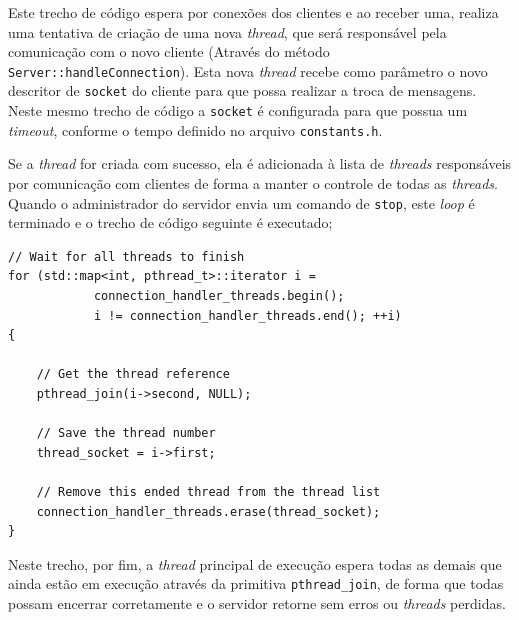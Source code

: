 \documentclass{article}
\begin{document}
\par Este trecho de código espera por conexões dos clientes e ao receber uma, realiza uma tentativa de criação de uma nova \textit{thread}, que será responsável pela comunicação com o novo cliente (Através do método \texttt{Server::handleConnection}). Esta nova \textit{thread} recebe como parâmetro o novo descritor de \texttt{socket} do cliente para que possa realizar a troca de mensagens. Neste mesmo trecho de código a \texttt{socket} é configurada para que possua um \textit{timeout}, conforme o tempo definido no arquivo \texttt{constants.h}.
\par Se a \textit{thread} for criada com sucesso, ela é adicionada à lista de \textit{threads} responsáveis por comunicação com clientes de forma a manter o controle de todas as \textit{threads}. Quando o administrador do servidor envia um comando de \texttt{stop}, este \textit{loop} é terminado e o trecho de código seguinte é executado;
\\
\begin{lstlisting}
// Wait for all threads to finish
for (std::map<int, pthread_t>::iterator i = 
            connection_handler_threads.begin();
            i != connection_handler_threads.end(); ++i)
{

    // Get the thread reference
    pthread_join(i->second, NULL);

    // Save the thread number
    thread_socket = i->first;
    
    // Remove this ended thread from the thread list
    connection_handler_threads.erase(thread_socket);
}
\end{lstlisting}
\par Neste trecho, por fim, a \textit{thread} principal de execução espera todas as demais que ainda estão em execução através da primitiva \texttt{pthread\_join}, de forma que todas possam encerrar corretamente e o servidor retorne sem erros ou \textit{threads} perdidas.

\end{document}
